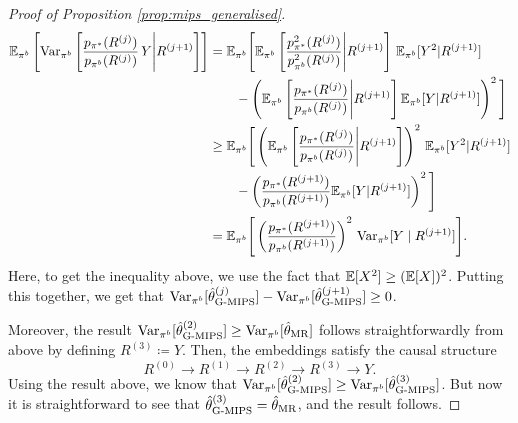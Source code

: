 \begin{proof}[Proof of Proposition \ref{prop:mips_generalised}]
    \begin{align*}
        \mathbb{E}_{\pi^b}\left[ \textup{Var}_{\pi^b}\left[\frac{p_{\pi^*}(R^{(j)})}{p_{\pi^b}(R^{(j)})}\, Y \Bigg| R^{(j+1)} \right] \right] &=
        \mathbb{E}_{\pi^b}\Bigg[ \mathbb{E}_{\pi^b}\left[\frac{p_{\pi^*}^2(R^{(j)})}{p_{\pi^b}^2(R^{(j)})} \Bigg| R^{(j+1)} \right]\,\mathbb{E}_{\pi^b}[Y^2 | R^{(j+1)}] \\
        &\qquad- \left(\mathbb{E}_{\pi^b}\left[\frac{p_{\pi^*}(R^{(j)})}{p_{\pi^b}(R^{(j)})} \Bigg| R^{(j+1)} \right] \mathbb{E}_{\pi^b}[Y | R^{(j+1)}] \right)^2 \Bigg]\\
        &\geq 
        \mathbb{E}_{\pi^b}\Bigg[ \left(\mathbb{E}_{\pi^b}\left[\frac{p_{\pi^*}(R^{(j)})}{p_{\pi^b}(R^{(j)})} \Bigg| R^{(j+1)} \right]\right)^2 \,\mathbb{E}_{\pi^b}[Y^2 | R^{(j+1)}] \\
        &\qquad- \left(\frac{p_{\pi^*}(R^{(j+1)})}{p_{\pi^b}(R^{(j+1)})} \mathbb{E}_{\pi^b}[Y | R^{(j+1)}] \right)^2 \Bigg]\\
        &= \mathbb{E}_{\pi^b}\Bigg[ \left(\frac{p_{\pi^*}(R^{(j+1)})}{p_{\pi^b}(R^{(j+1)})}\right)^2 \, \textup{Var}_{\pi^b}[Y\mid R^{(j+1)}] \Bigg].
    \end{align*}
    Here, to get the inequality above, we use the fact that $\mathbb{E}[X^2] \geq (\mathbb{E}[X])^2$. Putting this together, we get that $\textup{Var}_{\pi^b}[\hat{\theta}^{(j)}_{\textup{G-MIPS}}] - \textup{Var}_{\pi^b}[\hat{\theta}^{(j+1)}_{\textup{G-MIPS}}] \geq 0$.

    Moreover, the result $\textup{Var}_{\pi^b}[\hat{\theta}^{(2)}_{\textup{G-MIPS}}] \geq \textup{Var}_{\pi^b}[\hat{\theta}_{\textup{MR}}]$ follows straightforwardly from above by defining $R^{(3)} \coloneqq Y$. Then, the embeddings satisfy the causal structure 
    \[
    R^{(0)} \rightarrow R^{(1)} \rightarrow R^{(2)}  \rightarrow R^{(3)} \rightarrow Y.
    \]
    Using the result above, we know that $\textup{Var}_{\pi^b}[\hat{\theta}^{(2)}_{\textup{G-MIPS}}] \geq \textup{Var}_{\pi^b}[\hat{\theta}^{(3)}_{\textup{G-MIPS}}]$. But now it is straightforward to see that $\hat{\theta}^{(3)}_{\textup{G-MIPS}} = \hat{\theta}_{\textup{MR}}$, and the result follows.
\end{proof}

